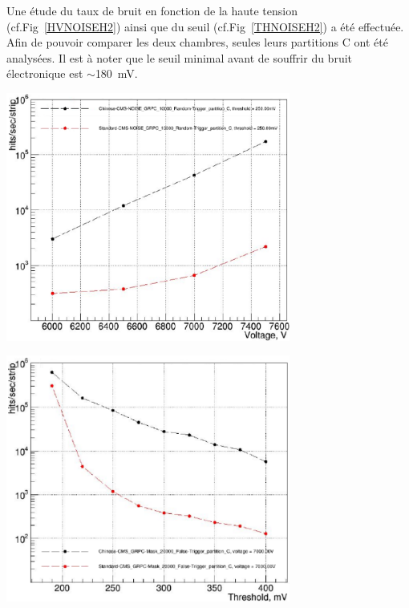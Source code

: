 Une étude du taux de bruit en fonction de la haute tension (cf.Fig~\ref{HVNOISEH2}) ainsi que du seuil (cf.Fig~\ref{THNOISEH2}) a été effectuée. Afin de pouvoir comparer les deux chambres, seules leurs partitions C ont été analysées.
Il est à noter que le seuil minimal avant de souffrir du bruit électronique est $\sim$\SI{180}{\milli\volt}.

\noindent
\begin{minipage}[th!]{0.98\textwidth}
	\noindent
	\centering
	\includegraphics[width=0.70\textwidth]{GLA/HVNOISEH2.png}
	\captionsetup{type=figure}\caption{Taux de bruit des partitions $C$ des chambres en fonction de la tension appliquée. Le seuil est fixé à \SI{250}{\milli\volt}. La chambre en verre standard (de basse résitivité) est en rouge (noir).}
	\label{HVNOISEH2}
\end{minipage}%


\noindent
\begin{minipage}[th!]{0.98\textwidth}
	\noindent
	\centering
	\includegraphics[width=0.70\textwidth]{GLA/THNOISEH2.png}
	\captionsetup{type=figure}\caption{Taux de bruit des partitions C des chambres en fonction du seuil appliqué. La tension appliquée est fixée à \SI{7000}{\volt}. La chambre en verre standard (de basse résitivité) est en rouge (noir).}
	\label{THNOISEH2}
\end{minipage}%

